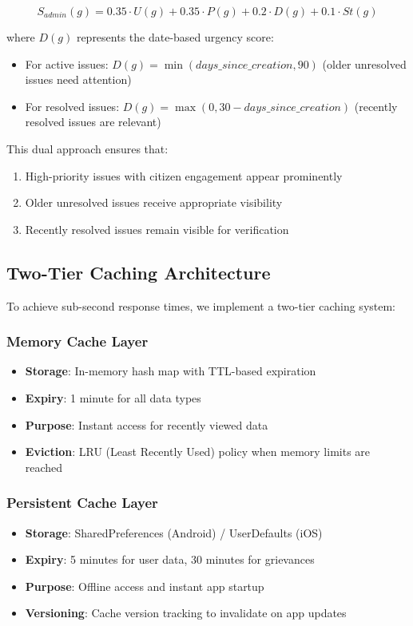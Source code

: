 \documentclass[12pt,a4paper]{article}
\begin{document}
\begin{equation}
S_{admin}(g) = 0.35 \cdot U(g) + 0.35 \cdot P(g) + 0.2 \cdot D(g) + 0.1 \cdot St(g)
\end{equation}

where $D(g)$ represents the date-based urgency score:
\begin{itemize}
    \item For active issues: $D(g) = \min(days\_since\_creation, 90)$ (older unresolved issues need attention)
    \item For resolved issues: $D(g) = \max(0, 30 - days\_since\_creation)$ (recently resolved issues are relevant)
\end{itemize}

This dual approach ensures that:
\begin{enumerate}
    \item High-priority issues with citizen engagement appear prominently
    \item Older unresolved issues receive appropriate visibility
    \item Recently resolved issues remain visible for verification
\end{enumerate}

\subsection{Two-Tier Caching Architecture}

To achieve sub-second response times, we implement a two-tier caching system:

\subsubsection{Memory Cache Layer}
\begin{itemize}
    \item \textbf{Storage}: In-memory hash map with TTL-based expiration
    \item \textbf{Expiry}: 1 minute for all data types
    \item \textbf{Purpose}: Instant access for recently viewed data
    \item \textbf{Eviction}: LRU (Least Recently Used) policy when memory limits are reached
\end{itemize}

\subsubsection{Persistent Cache Layer}
\begin{itemize}
    \item \textbf{Storage}: SharedPreferences (Android) / UserDefaults (iOS)
    \item \textbf{Expiry}: 5 minutes for user data, 30 minutes for grievances
    \item \textbf{Purpose}: Offline access and instant app startup
    \item \textbf{Versioning}: Cache version tracking to invalidate on app updates
\end{itemize}
\end{document}
